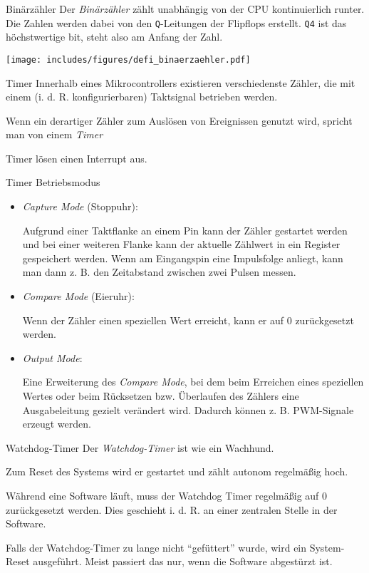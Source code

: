\begin{defi}{Binärzähler}
    Der \emph{Binärzähler} zählt unabhängig von der CPU kontinuierlich runter.
    Die Zahlen werden dabei von den \texttt{Q}-Leitungen der Flipflops erstellt.
    \texttt{Q4} ist das höchstwertige bit, steht also am Anfang der Zahl.

    \begin{center}
        \texttt{[image: includes/figures/defi\_binaerzaehler.pdf]}
    \end{center}
\end{defi}

\begin{defi}{Timer}
    Innerhalb eines Mikrocontrollers existieren verschiedenste Zähler, die mit einem (i. d. R. konfigurierbaren) Taktsignal betrieben werden.

    Wenn ein derartiger Zähler zum Auslösen von Ereignissen genutzt wird, spricht man von einem \emph{Timer}

    Timer lösen einen Interrupt aus.
\end{defi}

\begin{defi}{Timer Betriebsmodus}
    \begin{itemize}
        \item \emph{Capture Mode} (Stoppuhr):

              Aufgrund einer Taktflanke an einem Pin kann der Zähler gestartet werden und bei einer weiteren Flanke kann der aktuelle Zählwert in ein Register gespeichert werden.
              Wenn am Eingangspin eine Impulsfolge anliegt, kann man dann z. B. den Zeitabstand zwischen zwei Pulsen messen.
        \item \emph{Compare Mode} (Eieruhr):

              Wenn der Zähler einen speziellen Wert erreicht, kann er auf 0 zurückgesetzt werden.
        \item \emph{Output Mode}:

              Eine Erweiterung des \emph{Compare Mode}, bei dem beim Erreichen eines speziellen Wertes oder beim Rücksetzen bzw. Überlaufen des Zählers eine Ausgabeleitung gezielt verändert wird.
              Dadurch können z. B. PWM-Signale erzeugt werden.
    \end{itemize}
\end{defi}

\begin{defi}{Watchdog-Timer}
    Der \emph{Watchdog-Timer} ist wie ein Wachhund.

    Zum Reset des Systems wird er gestartet und zählt autonom regelmäßig hoch.

    Während eine Software läuft, muss der Watchdog Timer regelmäßig auf 0 zurückgesetzt werden.
    Dies geschieht i. d. R. an einer zentralen Stelle in der Software.

    Falls der Watchdog-Timer zu lange nicht \enquote{gefüttert} wurde, wird ein System-Reset ausgeführt.
    Meist passiert das nur, wenn die Software abgestürzt ist.
\end{defi}


